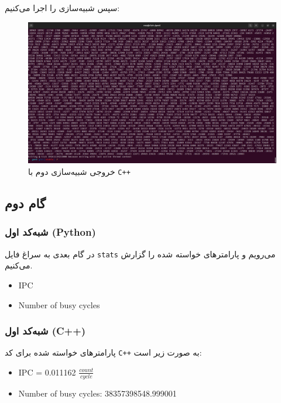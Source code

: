 \documentclass[12pt]{exam}
\begin{document}
\begin{multicols}{1}
	   سپس شبیه‌سازی را اجرا می‌کنیم:
	   \begin{center}
	   	\begin{figure}[H]
	   		\includegraphics[scale=0.12]{images/img6.png}
	   		\caption{خروجی شبیه‌سازی دوم با \texttt{C++}}
	   		\label{خروجی شبیه‌سازی دوم با cpp}
	   	\end{figure}
	   \end{center}
	  
	  
	  
	  
	  
	  
	  \subsection{گام دوم}
	  \subsubsection{شبه‌کد اول (Python)}
	  در گام بعدی به سراغ فایل \texttt{stats} می‌رویم و پارامتر‌های خواسته شده را گزارش می‌کنیم.
	  \begin{latin}
	  	\begin{itemize}
	  		\item IPC
	  		\item Number of busy cycles
	  	\end{itemize}
	  \end{latin}
	  
	  
	  
	  \subsubsection{شبه‌کد اول (C++)}
	  پارامتر‌های خواسته شده برای کد \texttt{C++} به صورت زیر است:
	  \begin{latin}
	  	\begin{itemize}
	  		\item IPC = 0.011162 $\frac{count}{cycle}$
		  		\item Number of busy cycles: 38357398548.999001
	  	\end{itemize}
	  \end{latin}
	  

\end{multicols}
\end{document}

